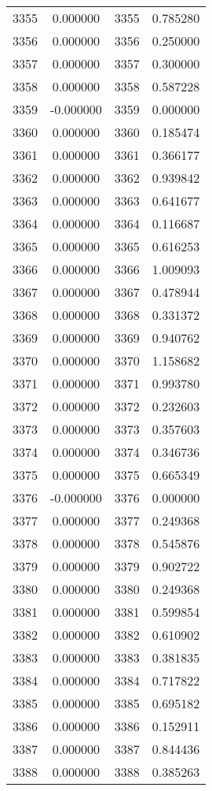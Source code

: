 \documentclass[12pt]{article}
\begin{document}
\begin{longtable}{@{}cccc@{}}
3355 & 0.000000 & 3355 & 0.785280 \\
3356 & 0.000000 & 3356 & 0.250000 \\
3357 & 0.000000 & 3357 & 0.300000 \\
3358 & 0.000000 & 3358 & 0.587228 \\
3359 & -0.000000 & 3359 & 0.000000 \\
3360 & 0.000000 & 3360 & 0.185474 \\
3361 & 0.000000 & 3361 & 0.366177 \\
3362 & 0.000000 & 3362 & 0.939842 \\
3363 & 0.000000 & 3363 & 0.641677 \\
3364 & 0.000000 & 3364 & 0.116687 \\
3365 & 0.000000 & 3365 & 0.616253 \\
3366 & 0.000000 & 3366 & 1.009093 \\
3367 & 0.000000 & 3367 & 0.478944 \\
3368 & 0.000000 & 3368 & 0.331372 \\
3369 & 0.000000 & 3369 & 0.940762 \\
3370 & 0.000000 & 3370 & 1.158682 \\
3371 & 0.000000 & 3371 & 0.993780 \\
3372 & 0.000000 & 3372 & 0.232603 \\
3373 & 0.000000 & 3373 & 0.357603 \\
3374 & 0.000000 & 3374 & 0.346736 \\
3375 & 0.000000 & 3375 & 0.665349 \\
3376 & -0.000000 & 3376 & 0.000000 \\
3377 & 0.000000 & 3377 & 0.249368 \\
3378 & 0.000000 & 3378 & 0.545876 \\
3379 & 0.000000 & 3379 & 0.902722 \\
3380 & 0.000000 & 3380 & 0.249368 \\
3381 & 0.000000 & 3381 & 0.599854 \\
3382 & 0.000000 & 3382 & 0.610902 \\
3383 & 0.000000 & 3383 & 0.381835 \\
3384 & 0.000000 & 3384 & 0.717822 \\
3385 & 0.000000 & 3385 & 0.695182 \\
3386 & 0.000000 & 3386 & 0.152911 \\
3387 & 0.000000 & 3387 & 0.844436 \\
3388 & 0.000000 & 3388 & 0.385263 \\

\end{longtable}
\end{document}
